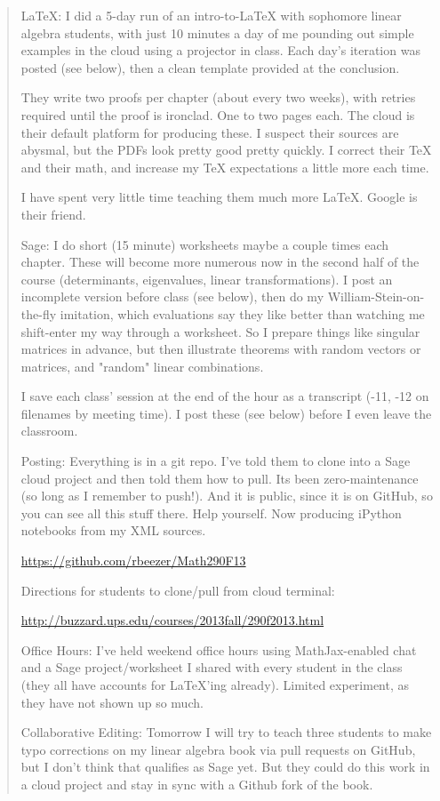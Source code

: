 \documentclass{article}
\begin{document}
\begin{quotation}
LaTeX:
I did a 5-day run of an intro-to-LaTeX with sophomore linear algebra students, with just 10 minutes a day of me pounding out simple examples in the cloud using a projector in class.  Each day's iteration was posted (see below), then a clean template provided at the conclusion.

They write two proofs per chapter (about every two weeks), with retries required until the proof is ironclad.  One to two pages each.  The cloud is their default platform for producing these.  I suspect their sources are abysmal, but the PDFs look pretty good pretty quickly.  I correct their TeX and their math, and increase my TeX expectations a little more each time.

I have spent very little time teaching them much more LaTeX.  Google is their friend.


Sage:
I do short (15 minute) worksheets maybe a couple times each chapter.  These will become more numerous now in the second half of the course (determinants, eigenvalues, linear transformations).  I post an incomplete version before class (see below), then do my William-Stein-on-the-fly imitation, which evaluations say they like better than watching me shift-enter my way through a worksheet. So I prepare things like singular matrices in advance, but then illustrate theorems with random vectors or matrices, and "random" linear combinations.

I save each class' session at the end of the hour as a transcript (-11, -12 on filenames by meeting time).  I post these (see below) before I even leave the classroom.


Posting:
Everything is in a git repo.  I've told them to clone into a Sage cloud project and then told them how to pull.  Its been zero-maintenance (so long as I remember to push!).  And it is public, since it is on GitHub, so you can see all this stuff there.  Help yourself.  Now producing iPython notebooks from my XML sources.

\url{https://github.com/rbeezer/Math290F13}

Directions for students to clone/pull from cloud terminal:

\url{http://buzzard.ups.edu/courses/2013fall/290f2013.html}


Office Hours:
I've held weekend office hours using MathJax-enabled chat and a Sage project/worksheet I shared with every student in the class (they all have accounts for LaTeX'ing already).  Limited experiment, as they have not shown up so much.


Collaborative Editing:
Tomorrow I will try to teach three students to make typo corrections on my linear algebra book via pull requests on GitHub, but I don't think that qualifies as Sage yet.  But they could do this work in a cloud project and stay in sync with a Github fork of the book.

\end{quotation}
\end{document}
